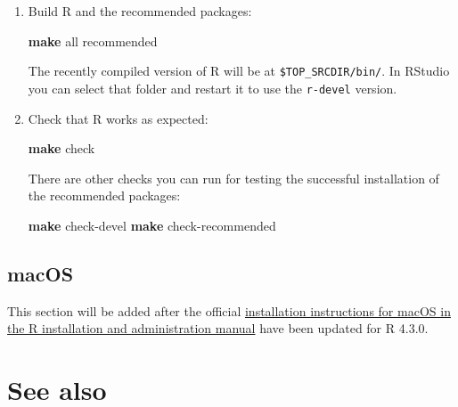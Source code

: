 \documentclass[
]{book}
\newenvironment{Shaded}{\begin{snugshade}}{\end{snugshade}}
\newcommand{\BuiltInTok}[1]{#1}
\newcommand{\FunctionTok}[1]{\textcolor[rgb]{0.13,0.29,0.53}{\textbf{#1}}}
\newcommand{\NormalTok}[1]{#1}
\newcommand{\StringTok}[1]{\textcolor[rgb]{0.31,0.60,0.02}{#1}}
\newcommand{\VariableTok}[1]{\textcolor[rgb]{0.00,0.00,0.00}{#1}}
\begin{document}
\begin{enumerate}
\begin{Shaded}
\end{Shaded}
\item
  Build R and the recommended packages:

\begin{Shaded}
\begin{Highlighting}[]
\FunctionTok{make}\NormalTok{ all recommended}
\end{Highlighting}
\end{Shaded}

  The recently compiled version of R will be at \texttt{\$TOP\_SRCDIR/bin/}.
  In RStudio you can select that folder and restart it to use the \texttt{r-devel} version.
\item
  Check that R works as expected:

\begin{Shaded}
\begin{Highlighting}[]
\FunctionTok{make}\NormalTok{ check}
\end{Highlighting}
\end{Shaded}

  There are other checks you can run for testing the successful installation of the recommended packages:

\begin{Shaded}
\begin{Highlighting}[]
\FunctionTok{make}\NormalTok{ check{-}devel}
\FunctionTok{make}\NormalTok{ check{-}recommended}
\end{Highlighting}
\end{Shaded}
\end{enumerate}

\subsection{macOS}\label{macos}

This section will be added after the official \href{https://cran.r-project.org/doc/manuals/r-devel/R-admin.html\#macOS}{installation instructions for macOS in the R installation and administration manual} have been updated for R 4.3.0.

\section{See also}\label{see-also}
\end{document}
